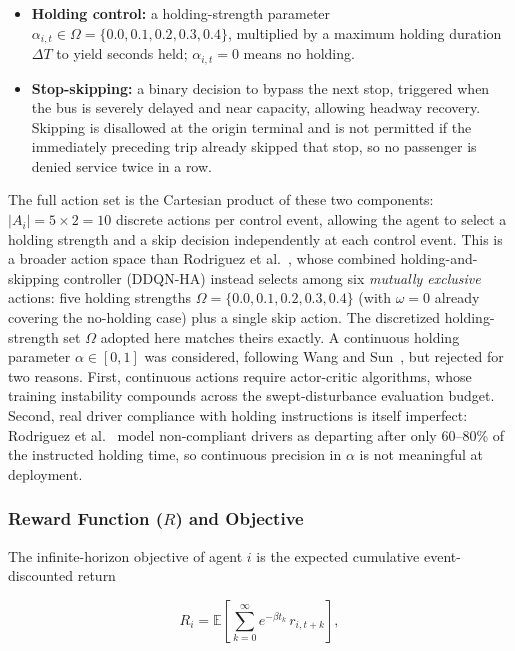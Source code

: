 \begin{itemize}
\item \textbf{Holding control:} a holding-strength parameter $\alpha_{i,t} \in \Omega = \{0.0, 0.1, 0.2, 0.3, 0.4\}$, multiplied by a maximum holding duration $\Delta T$ to yield seconds held; $\alpha_{i,t} = 0$ means no holding.
\item \textbf{Stop-skipping:} a binary decision to bypass the next stop, triggered when the bus is severely delayed and near capacity, allowing headway recovery. Skipping is disallowed at the origin terminal and is not permitted if the immediately preceding trip already skipped that stop, so no passenger is denied service twice in a row.
\end{itemize}

The full action set is the Cartesian product of these two components: $|A_i| = 5 \times 2 = 10$ discrete actions per control event, allowing the agent to select a holding strength and a skip decision independently at each control event. This is a broader action space than Rodriguez et al.~\cite{Rodriguez2023Cooperative}, whose combined holding-and-skipping controller (DDQN-HA) instead selects among six \textit{mutually exclusive} actions: five holding strengths $\Omega = \{0.0, 0.1, 0.2, 0.3, 0.4\}$ (with $\omega = 0$ already covering the no-holding case) plus a single skip action. The discretized holding-strength set $\Omega$ adopted here matches theirs exactly. A continuous holding parameter $\alpha \in [0, 1]$ was considered, following Wang and Sun~\cite{Wangsun}, but rejected for two reasons. First, continuous actions require actor-critic algorithms, whose training instability compounds across the swept-disturbance evaluation budget. Second, real driver compliance with holding instructions is itself imperfect: Rodriguez et al.~\cite{Rodriguez2023Cooperative} model non-compliant drivers as departing after only 60--80\% of the instructed holding time, so continuous precision in $\alpha$ is not meaningful at deployment.

\subsubsection{Reward Function ($R$) and Objective}
\label{subsec:reward}

The infinite-horizon objective of agent $i$ is the expected cumulative event-discounted return

\begin{equation}
R_i = \mathbb{E}\!\left[\sum_{k=0}^{\infty} e^{-\beta t_k}\, r_{i, t+k}\right],
\end{equation}

